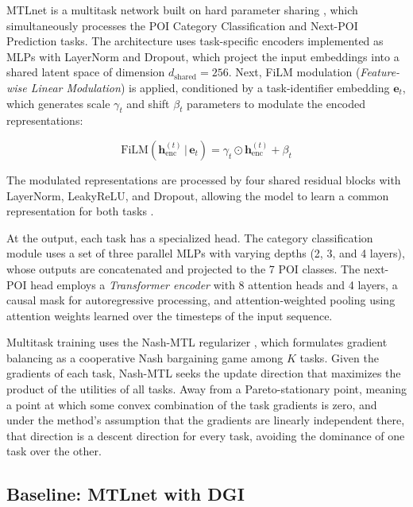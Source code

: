 MTLnet \cite{silva2025mtlnet} is a multitask network built on hard parameter sharing \cite{caruana1997multitask}, which simultaneously processes the POI Category Classification and Next-POI Prediction tasks. The architecture uses task-specific encoders implemented as MLPs with LayerNorm and Dropout, which project the input embeddings into a shared latent space of dimension $d_{\mathrm{shared}} = 256$. Next, FiLM modulation (\textit{Feature-wise Linear Modulation}) \cite{perez2018film} is applied, conditioned by a task-identifier embedding $\mathbf{e}_{t}$, which generates scale $\gamma_{t}$ and shift $\beta_{t}$ parameters to modulate the encoded representations:

\begin{equation}
\mathrm{FiLM}(\mathbf{h}_{\mathrm{enc}}^{(t)} \,|\, \mathbf{e}_{t}) = \gamma_{t} \odot \mathbf{h}_{\mathrm{enc}}^{(t)} + \beta_{t}
\label{eq:courb:film}
\end{equation}

The modulated representations are processed by four shared residual blocks with LayerNorm, LeakyReLU, and Dropout, allowing the model to learn a common representation for both tasks \cite{baxter2000model}.

At the output, each task has a specialized head. The category classification module uses a set of three parallel MLPs with varying depths (2, 3, and 4 layers), whose outputs are concatenated and projected to the 7 POI classes. The next-POI head employs a \textit{Transformer encoder} with 8 attention heads and 4 layers, a causal mask for autoregressive processing, and attention-weighted pooling using attention weights learned over the timesteps of the input sequence.

Multitask training uses the Nash-MTL regularizer \cite{nash}, which formulates gradient balancing as a cooperative Nash bargaining game among $K$ tasks. Given the gradients of each task, Nash-MTL seeks the update direction that maximizes the product of the utilities of all tasks. Away from a Pareto-stationary point, meaning a point at which some convex combination of the task gradients is zero, and under the method's assumption that the gradients are linearly independent there, that direction is a descent direction for every task, avoiding the dominance of one task over the other.

\subsection{Baseline: MTLnet with DGI}

